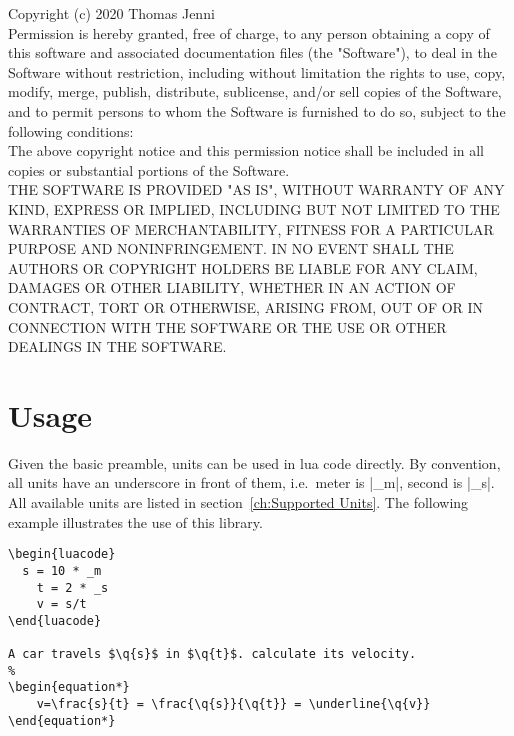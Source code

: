 \documentclass{ltxdoc}
\newcommand{\q}[1]{%
  \directlua{tex.print(physical.Quantity.tosiunitx(#1,"add-decimal-zero=true,scientific-notation=fixed,exponent-to-prefix=false"))}%
}
\begin{document}
Copyright (c) 2020 Thomas Jenni\\

Permission is hereby granted, free of charge, to any person obtaining a copy of this software and associated documentation files (the "Software"), to deal in the Software without restriction, including without limitation the rights to use, copy, modify, merge, publish, distribute, sublicense, and/or sell copies of the Software, and to permit persons to whom the Software is furnished to do so, subject to the following conditions:\\

The above copyright notice and this permission notice shall be included in all copies or substantial portions of the Software.\\

THE SOFTWARE IS PROVIDED "AS IS", WITHOUT WARRANTY OF ANY KIND, EXPRESS OR IMPLIED, INCLUDING BUT NOT LIMITED TO THE WARRANTIES OF MERCHANTABILITY, FITNESS FOR A PARTICULAR PURPOSE AND NONINFRINGEMENT. IN NO EVENT SHALL THE AUTHORS OR COPYRIGHT HOLDERS BE LIABLE FOR ANY CLAIM, DAMAGES OR OTHER LIABILITY, WHETHER IN AN ACTION OF CONTRACT, TORT OR OTHERWISE, ARISING FROM, OUT OF OR IN CONNECTION WITH THE SOFTWARE OR THE USE OR OTHER DEALINGS IN THE SOFTWARE.



\newpage
\section{Usage}
\label{ch:usage}

Given the basic preamble, units can be used in lua code directly. By convention, all units have an underscore in front of them, i.e.\ meter is |_m|, second is |_s|. All available units are listed in section~\ref{ch:Supported Units}. The following example illustrates the use of this library.

\begin{lstlisting}[caption=Velocity of a car.,label=lst:Car Velocity]
\begin{luacode}
  s = 10 * _m
	t = 2 * _s
	v = s/t
\end{luacode}

A car travels $\q{s}$ in $\q{t}$. calculate its velocity.
%
\begin{equation*}
	v=\frac{s}{t} = \frac{\q{s}}{\q{t}} = \underline{\q{v}}
\end{equation*}
\end{lstlisting}
\end{document}

